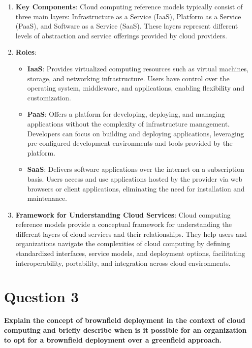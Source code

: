 \documentclass[11pt]{article}
\begin{document}
\begin{enumerate}
    \item \textbf{Key Components}: Cloud computing reference models typically consist of three main layers: Infrastructure as a Service (IaaS), Platform as a Service (PaaS), and Software as a Service (SaaS). These layers represent different levels of abstraction and service offerings provided by cloud providers.

    \item \textbf{Roles}:
          \begin{itemize}
              \item \textbf{IaaS}: Provides virtualized computing resources such as virtual machines, storage, and networking infrastructure. Users have control over the operating system, middleware, and applications, enabling flexibility and customization.
              \item \textbf{PaaS}: Offers a platform for developing, deploying, and managing applications without the complexity of infrastructure management. Developers can focus on building and deploying applications, leveraging pre-configured development environments and tools provided by the platform.
              \item \textbf{SaaS}: Delivers software applications over the internet on a subscription basis. Users access and use applications hosted by the provider via web browsers or client applications, eliminating the need for installation and maintenance.
          \end{itemize}

    \item \textbf{Framework for Understanding Cloud Services}: Cloud computing reference models provide a conceptual framework for understanding the different layers of cloud services and their relationships. They help users and organizations navigate the complexities of cloud computing by defining standardized interfaces, service models, and deployment options, facilitating interoperability, portability, and integration across cloud environments.
\end{enumerate}

\section{Question 3}
\textbf{Explain the concept of brownfield deployment in the context of cloud computing and briefly describe when is it possible for an organization to opt for a brownfield deployment over a greenfield approach.}
\end{document}
